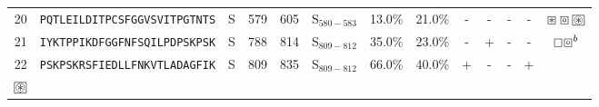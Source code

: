 \begin{tabular}{rcccccccccccc}
20 &  \texttt{PQTLEILDITPCSFGGVSVITPGTNTS} &       S &    579 &   605 &  S$_{580-583}$ &                          13.0\% &                           21.0\% &          - &           - &          - &           - &                                                                         $ \boxast \boxcircle \setlength{\fboxsep}{0.5pt} \boxed{\circledast} $ \\
21 &  \texttt{IYKTPPIKDFGGFNFSQILPDPSKPSK} &       S &    788 &   814 &  S$_{809-812}$ &                          35.0\% &                           23.0\% &          - &           + &          - &           - &                                                                                                                     $ \boxempty \boxcircle^b $ \\
22 &  \texttt{PSKPSKRSFIEDLLFNKVTLADAGFIK} &       S &    809 &   835 &  S$_{809-812}$ &                          66.0\% &                           40.0\% &          + &           - &          - &           + &                             \Centerstack{  $\boxast \boxast^b \boxcircle \boxcircle^d$ \\  $\setlength{\fboxsep}{0.5pt} \boxed{\circledast}$ } \\
\bottomrule
\end{tabular}
